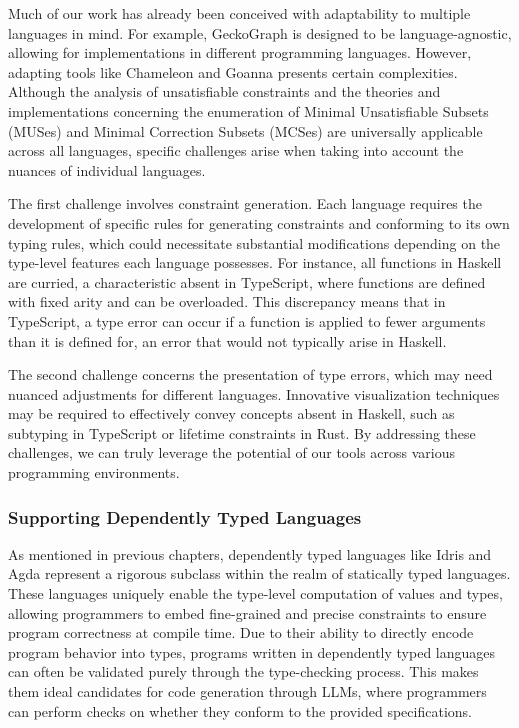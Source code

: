 Much of our work has already been conceived with adaptability to multiple languages in mind. For example, GeckoGraph is designed to be language-agnostic, allowing for implementations in different programming languages. However, adapting tools like Chameleon and Goanna presents certain complexities. Although the analysis of unsatisfiable constraints and the theories and implementations concerning the enumeration of Minimal Unsatisfiable Subsets (MUSes) and Minimal Correction Subsets (MCSes) are universally applicable across all languages, specific challenges arise when taking into account the nuances of individual languages.

The first challenge involves constraint generation. Each language requires the development of specific rules for generating constraints and conforming to its own typing rules, which could necessitate substantial modifications depending on the type-level features each language possesses. For instance, all functions in Haskell are curried, a characteristic absent in TypeScript, where functions are defined with fixed arity and can be overloaded. This discrepancy means that in TypeScript, a type error can occur if a function is applied to fewer arguments than it is defined for, an error that would not typically arise in Haskell.

The second challenge concerns the presentation of type errors, which may need nuanced adjustments for different languages. Innovative visualization techniques may be required to effectively convey concepts absent in Haskell, such as subtyping in TypeScript or lifetime constraints in Rust. By addressing these challenges, we can truly leverage the potential of our tools across various programming environments.

\subsubsection{Supporting Dependently Typed Languages}

As mentioned in previous chapters, dependently typed languages like Idris and Agda represent a rigorous subclass within the realm of statically typed languages. These languages uniquely enable the type-level computation of values and types, allowing programmers to embed fine-grained and precise constraints to ensure program correctness at compile time. Due to their ability to directly encode program behavior into types, programs written in dependently typed languages can often be validated purely through the type-checking process. This makes them ideal candidates for code generation through LLMs, where programmers can perform checks on whether they conform to the provided specifications. 

